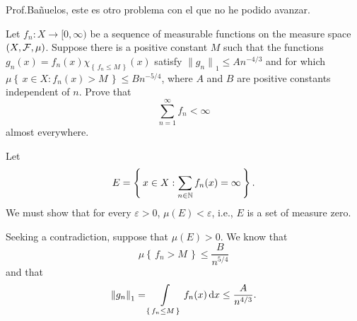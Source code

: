 \documentclass[12pt,twoside]{article}
\renewcommand*{\thefootnote}{\fnsymbol{footnote}}
\begin{document}
\renewcommand*{\thefootnote}{\fnsymbol{footnote}}

\thispagestyle{empty}
\author{\href{mailto:\email}{\auth}}
\title{\tight}
\date{\today}
\maketitle

Prof.\@ Bañuelos, este es otro problema con el que no he podido avanzar.
\begin{problem}
  Let $f_n\colon X\to[0,\infty)$ be a sequence of measurable functions on
  the measure space $(X,\mathcal{F},\mu)$. Suppose there is a positive constant
  $M$ such that the functions
  $g_n(x)=f_n (x)\chi_{\left\{\,f_n\leq M\,\right\}}(x)$ satisfy
  ${\|g_n\|}_1\leq An^{-4/3}$ and for which
  $\mu\left\{\,x\in X:f_n(x)>M\,\right\}\leq Bn^{-5/4}$, where $A$ and $B$
  are positive constants independent of $n$. Prove that
  \[
    \sum_{n=1}^\infty f_n<\infty
  \]
  almost everywhere.
\end{problem}
\begin{solution}
  Let
  \[
    E=\left\{\,x\in X:\sum_{n\in\mathbb{N}} f_n(x)=\infty\,\right\}.
  \]
  We must show that for every $\varepsilon>0$, $\mu(E)<\varepsilon$, i.e.,
  $E$ is a set of measure zero.

  Seeking a contradiction, suppose that $\mu(E)>0$. We know that
  \[
    \mu\left\{\,f_n>M\,\right\}\leq\frac{B}{n^{5/4}}
  \]
  and that
  \[
    {\|g_n\|}_1=\int\limits_{\left\{\,f_n\leq M\,\right\}}
    f_n(x)\mathop{}\!\mathrm{d} x\leq\frac{A}{n^{4/3}}.
  \]
\end{solution}
\end{document}
